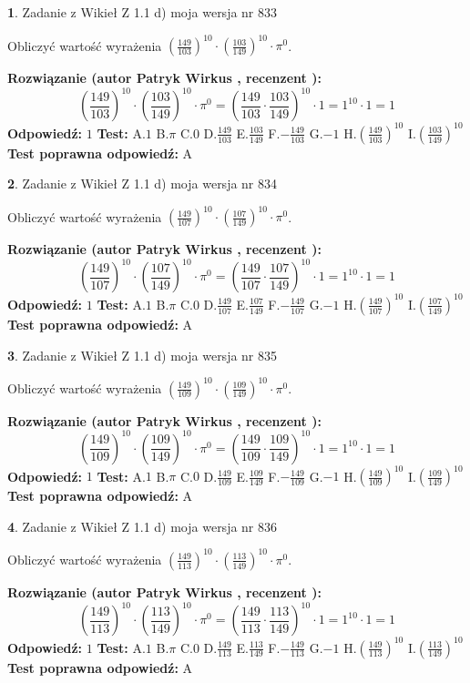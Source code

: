 \documentclass[12pt, a4paper]{article}
\theoremstyle{definition} %
\newtheorem{zad}{}
\newcommand{\zadStart}[1]{\begin{zad}#1\newline}
\newcommand{\zadStop}{\end{zad}}
\newcommand{\rozwStart}[2]{\noindent \textbf{Rozwiązanie (autor #1 , recenzent #2): }\newline}
\newcommand{\rozwStop}{\newline}
\newcommand{\odpStart}{\noindent \textbf{Odpowiedź:}\newline}
\newcommand{\odpStop}{\newline}
\newcommand{\testStart}{\noindent \textbf{Test:}\newline}
\newcommand{\testStop}{\newline}
\newcommand{\kluczStart}{\noindent \textbf{Test poprawna odpowiedź:}\newline}
\newcommand{\kluczStop}{\newline}
\begin{document}
\zadStart{Zadanie z Wikieł Z 1.1 d) moja wersja nr 833}

Obliczyć wartość wyrażenia $(\frac{149}{103})^{10} \cdot (\frac{103}{149})^{10} \cdot \pi^{0}$.
\zadStop
\rozwStart{Patryk Wirkus}{}
$$(\frac{149}{103})^{10} \cdot (\frac{103}{149})^{10} \cdot \pi^{0} = (\frac{149}{103} \cdot \frac{103}{149})^{10} \cdot 1 = 1^{10} \cdot 1 = 1$$
\rozwStop
\odpStart
$1$
\odpStop
\testStart
A.$1$ B.$\pi$ C.$0$ D.$\frac{149}{103}$ E.$\frac{103}{149}$
F.$-\frac{149}{103}$ G.$-1$
H.$(\frac{149}{103})^{10}$
I.$(\frac{103}{149})^{10}$
\testStop
\kluczStart
A
\kluczStop



\zadStart{Zadanie z Wikieł Z 1.1 d) moja wersja nr 834}

Obliczyć wartość wyrażenia $(\frac{149}{107})^{10} \cdot (\frac{107}{149})^{10} \cdot \pi^{0}$.
\zadStop
\rozwStart{Patryk Wirkus}{}
$$(\frac{149}{107})^{10} \cdot (\frac{107}{149})^{10} \cdot \pi^{0} = (\frac{149}{107} \cdot \frac{107}{149})^{10} \cdot 1 = 1^{10} \cdot 1 = 1$$
\rozwStop
\odpStart
$1$
\odpStop
\testStart
A.$1$ B.$\pi$ C.$0$ D.$\frac{149}{107}$ E.$\frac{107}{149}$
F.$-\frac{149}{107}$ G.$-1$
H.$(\frac{149}{107})^{10}$
I.$(\frac{107}{149})^{10}$
\testStop
\kluczStart
A
\kluczStop



\zadStart{Zadanie z Wikieł Z 1.1 d) moja wersja nr 835}

Obliczyć wartość wyrażenia $(\frac{149}{109})^{10} \cdot (\frac{109}{149})^{10} \cdot \pi^{0}$.
\zadStop
\rozwStart{Patryk Wirkus}{}
$$(\frac{149}{109})^{10} \cdot (\frac{109}{149})^{10} \cdot \pi^{0} = (\frac{149}{109} \cdot \frac{109}{149})^{10} \cdot 1 = 1^{10} \cdot 1 = 1$$
\rozwStop
\odpStart
$1$
\odpStop
\testStart
A.$1$ B.$\pi$ C.$0$ D.$\frac{149}{109}$ E.$\frac{109}{149}$
F.$-\frac{149}{109}$ G.$-1$
H.$(\frac{149}{109})^{10}$
I.$(\frac{109}{149})^{10}$
\testStop
\kluczStart
A
\kluczStop



\zadStart{Zadanie z Wikieł Z 1.1 d) moja wersja nr 836}

Obliczyć wartość wyrażenia $(\frac{149}{113})^{10} \cdot (\frac{113}{149})^{10} \cdot \pi^{0}$.
\zadStop
\rozwStart{Patryk Wirkus}{}
$$(\frac{149}{113})^{10} \cdot (\frac{113}{149})^{10} \cdot \pi^{0} = (\frac{149}{113} \cdot \frac{113}{149})^{10} \cdot 1 = 1^{10} \cdot 1 = 1$$
\rozwStop
\odpStart
$1$
\odpStop
\testStart
A.$1$ B.$\pi$ C.$0$ D.$\frac{149}{113}$ E.$\frac{113}{149}$
F.$-\frac{149}{113}$ G.$-1$
H.$(\frac{149}{113})^{10}$
I.$(\frac{113}{149})^{10}$
\testStop
\kluczStart
A
\kluczStop
\end{document}
